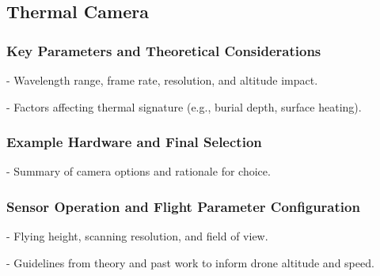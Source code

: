 \subsection{Thermal Camera}

\subsubsection{Key Parameters and Theoretical Considerations}
- Wavelength range, frame rate, resolution, and altitude impact.

- Factors affecting thermal signature (e.g., burial depth, surface heating).

\subsubsection{Example Hardware and Final Selection}
- Summary of camera options and rationale for choice.

\subsubsection{Sensor Operation and Flight Parameter Configuration}
- Flying height, scanning resolution, and field of view.

- Guidelines from theory and past work to inform drone altitude and speed.